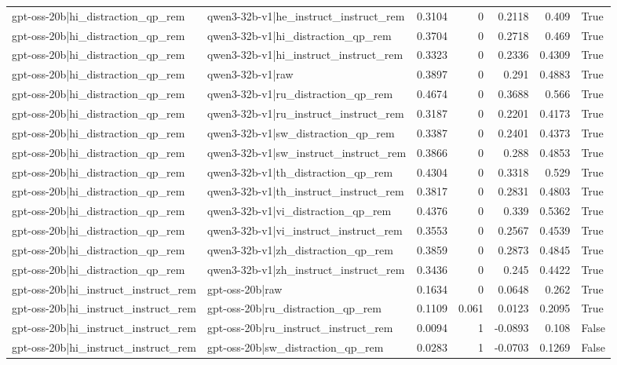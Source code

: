 \begin{table}
\begin{tabular}{l l r r r r l}
gpt-oss-20b|hi_distraction_qp_rem & qwen3-32b-v1|he_instruct_instruct_rem & 0.3104 & 0 & 0.2118 & 0.409 & True \\
gpt-oss-20b|hi_distraction_qp_rem & qwen3-32b-v1|hi_distraction_qp_rem & 0.3704 & 0 & 0.2718 & 0.469 & True \\
gpt-oss-20b|hi_distraction_qp_rem & qwen3-32b-v1|hi_instruct_instruct_rem & 0.3323 & 0 & 0.2336 & 0.4309 & True \\
gpt-oss-20b|hi_distraction_qp_rem & qwen3-32b-v1|raw & 0.3897 & 0 & 0.291 & 0.4883 & True \\
gpt-oss-20b|hi_distraction_qp_rem & qwen3-32b-v1|ru_distraction_qp_rem & 0.4674 & 0 & 0.3688 & 0.566 & True \\
gpt-oss-20b|hi_distraction_qp_rem & qwen3-32b-v1|ru_instruct_instruct_rem & 0.3187 & 0 & 0.2201 & 0.4173 & True \\
gpt-oss-20b|hi_distraction_qp_rem & qwen3-32b-v1|sw_distraction_qp_rem & 0.3387 & 0 & 0.2401 & 0.4373 & True \\
gpt-oss-20b|hi_distraction_qp_rem & qwen3-32b-v1|sw_instruct_instruct_rem & 0.3866 & 0 & 0.288 & 0.4853 & True \\
gpt-oss-20b|hi_distraction_qp_rem & qwen3-32b-v1|th_distraction_qp_rem & 0.4304 & 0 & 0.3318 & 0.529 & True \\
gpt-oss-20b|hi_distraction_qp_rem & qwen3-32b-v1|th_instruct_instruct_rem & 0.3817 & 0 & 0.2831 & 0.4803 & True \\
gpt-oss-20b|hi_distraction_qp_rem & qwen3-32b-v1|vi_distraction_qp_rem & 0.4376 & 0 & 0.339 & 0.5362 & True \\
gpt-oss-20b|hi_distraction_qp_rem & qwen3-32b-v1|vi_instruct_instruct_rem & 0.3553 & 0 & 0.2567 & 0.4539 & True \\
gpt-oss-20b|hi_distraction_qp_rem & qwen3-32b-v1|zh_distraction_qp_rem & 0.3859 & 0 & 0.2873 & 0.4845 & True \\
gpt-oss-20b|hi_distraction_qp_rem & qwen3-32b-v1|zh_instruct_instruct_rem & 0.3436 & 0 & 0.245 & 0.4422 & True \\
gpt-oss-20b|hi_instruct_instruct_rem & gpt-oss-20b|raw & 0.1634 & 0 & 0.0648 & 0.262 & True \\
gpt-oss-20b|hi_instruct_instruct_rem & gpt-oss-20b|ru_distraction_qp_rem & 0.1109 & 0.061 & 0.0123 & 0.2095 & True \\
gpt-oss-20b|hi_instruct_instruct_rem & gpt-oss-20b|ru_instruct_instruct_rem & 0.0094 & 1 & -0.0893 & 0.108 & False \\
gpt-oss-20b|hi_instruct_instruct_rem & gpt-oss-20b|sw_distraction_qp_rem & 0.0283 & 1 & -0.0703 & 0.1269 & False \\

\end{tabular}
\end{table}
